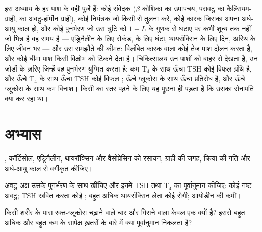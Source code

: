 \begin{remark}[नियंत्रण के रूप में समस्थापन]\label{rem:b3:endocrinology:control}
इस अध्याय के हर पाश के वही पुर्ज़े हैं: कोई संवेदक ($\beta$ कोशिका का
उपापचय, परावटु का कैल्सियम-ग्राही,  का अवटु-हॉर्मोन ग्राही), कोई
नियंत्रक जो किसी  से तुलना करे, कोई कारक  जिसका अपना
अर्ध-आयु काल हो, और कोई पुनर्भरण जो उस त्रुटि को $1 + L$ के गुणक से
घटाए पर कभी शून्य तक नहीं। जो भिन्न है वह समय है --- एड्रिनैलीन के लिए
सेकंड,  के लिए घंटा, थायरॉक्सिन के लिए दिन, अस्थि के लिए जीवन भर
--- और उस समझौते की कीमत: विलंबित कारक वाला कोई तेज़ पाश दोलन करता है,
और कोई धीमा पाश किसी विक्षोभ को टिकने देता है। चिकित्सालय उन पाशों को
बाहर से देखता है, उन जोड़ों के ज़रिए जिन्हें वह पुनर्भरण युग्मित करता
है: कम T$_{4}$ के साथ ऊँचा TSH कोई विफल ग्रंथि है, और ऊँचे T$_{4}$ के
साथ ऊँचा TSH कोई विफल ; ऊँचे ग्लूकोस के साथ ऊँचा  प्रतिरोध
है, और ऊँचे ग्लूकोस के साथ कम  विनाश। किसी  का स्तर
पढ़ने के लिए यह पूछना ही पड़ता है कि उसका सेनापति क्या कर रहा था।
\end{remark}

\section{अभ्यास}

\begin{exercise}[$\star$]\label{exo:b3:endocrinology:1}
, कॉर्टिसोल, एड्रिनैलीन, थायरॉक्सिन और वैसोप्रेसिन को रसायन,
ग्राही की जगह, क्रिया की गति और अर्ध-आयु काल से वर्गीकृत कीजिए।
\end{exercise}

\begin{exercise}[$\star$]\label{exo:b3:endocrinology:2}
अवटु अक्ष उसके पुनर्भरण के साथ खींचिए और इनमें TSH तथा T$_{4}$ का
पूर्वानुमान कीजिए: कोई नष्ट अवटु; TSH स्रवित करता कोई  ;
बहुत अधिक थायरॉक्सिन लेता कोई रोगी; आयोडीन की कमी।
\end{exercise}

\begin{exercise}[$\star$]\label{exo:b3:endocrinology:3}
किसी शरीर के पास रक्त-ग्लूकोस चढ़ाने वाले चार  और गिराने वाला
केवल एक क्यों है? इससे बहुत अधिक और बहुत कम  के सापेक्ष ख़तरों
के बारे में क्या पूर्वानुमान निकलता है?
\end{exercise}


